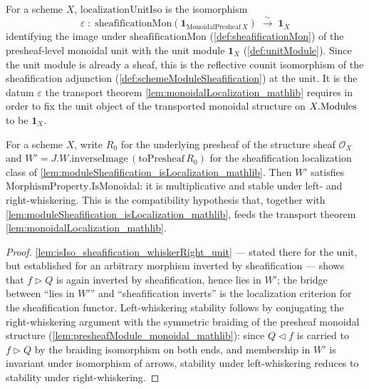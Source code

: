 \begin{definition}

  \label{def:localizationUnitIso}
  For a scheme \(X\), \(\mathrm{localizationUnitIso}\) is the isomorphism
  \[
    \varepsilon \;:\;
      \mathrm{sheafificationMon}(\mathbf{1}_{\mathrm{MonoidalPresheaf}\,X})
      \;\xrightarrow{\ \sim\ }\; \mathbf{1}_X
  \]
  identifying the image under \(\mathrm{sheafificationMon}\)
  (\cref{def:sheafificationMon}) of the presheaf-level monoidal unit with the
  unit module \(\mathbf{1}_X\) (\cref{def:unitModule}). Since the unit module is
  already a sheaf, this is the reflective counit isomorphism of the
  sheafification adjunction (\cref{def:schemeModuleSheafification}) at the unit.
  It is the datum \(\varepsilon\) the transport theorem
  \cref{lem:monoidalLocalization_mathlib} requires in order to fix the unit
  object of the transported monoidal structure on \(X.\mathrm{Modules}\) to be
  \(\mathbf{1}_X\).
\end{definition}

\begin{definition}

  \label{def:sheafModule_W_isMonoidal}
  For a scheme \(X\), write \(R_0\) for the underlying presheaf of the structure
  sheaf \(\mathcal{O}_X\) and
  \(W' = J.W.\mathrm{inverseImage}\,(\mathrm{toPresheaf}\,R_0)\) for the
  sheafification localization class of
  \cref{lem:moduleSheafification_isLocalization_mathlib}. Then \(W'\) satisfies
  \(\mathrm{MorphismProperty.IsMonoidal}\): it is multiplicative and stable under
  left- and right-whiskering. This is the compatibility hypothesis that, together
  with \cref{lem:moduleSheafification_isLocalization_mathlib}, feeds the transport
  theorem \cref{lem:monoidalLocalization_mathlib}.
\end{definition}

\begin{proof}
  \leanok
  \cref{lem:isIso_sheafification_whiskerRight_unit} --- stated there for the unit,
  but established for an arbitrary morphism inverted by sheafification --- shows
  that \(f \rhd Q\) is again inverted by sheafification, hence lies in \(W'\); the
  bridge between ``lies in \(W'\)'' and ``sheafification inverts'' is the
  localization criterion for the sheafification functor. Left-whiskering stability
  follows by conjugating the right-whiskering argument with the symmetric braiding of
  the presheaf monoidal structure (\cref{lem:presheafModule_monoidal_mathlib}):
  since \(Q \lhd f\) is carried to \(f \rhd Q\) by the braiding isomorphism on
  both ends, and membership in \(W'\) is invariant under isomorphism of arrows,
  stability under left-whiskering reduces to stability under right-whiskering.
\end{proof}

